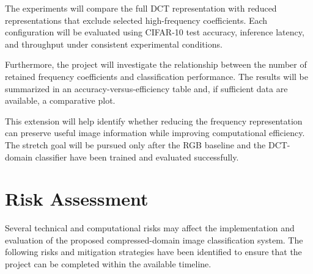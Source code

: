 \documentclass[11pt]{article}
\begin{document}
The experiments will compare the full DCT representation with reduced
representations that exclude selected high-frequency coefficients.
Each configuration will be evaluated using CIFAR-10 test accuracy,
inference latency, and throughput under consistent experimental
conditions.

Furthermore, the project will investigate the relationship between the
number of retained frequency coefficients and classification performance.
The results will be summarized in an accuracy-versus-efficiency table
and, if sufficient data are available, a comparative plot.

This extension will help identify whether reducing the frequency
representation can preserve useful image information while improving
computational efficiency. The stretch goal will be pursued only after
the RGB baseline and the DCT-domain classifier have been trained and
evaluated successfully.


\section{Risk Assessment}
\label{sec:risk}

Several technical and computational risks may affect the implementation
and evaluation of the proposed compressed-domain image classification
system. The following risks and mitigation strategies have been identified
to ensure that the project can be completed within the available timeline.
\end{document}
